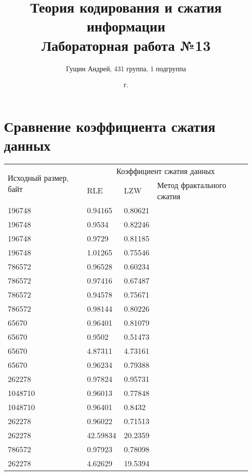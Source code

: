 \documentclass[a4paper,oneside]{article}
\title{{Теория кодирования и сжатия информации}\\{Лабораторная работа №13}}
\author{Гущин Андрей, 431 группа, 1 подгруппа}
\date{\the\year{} г.}
\theoremstyle{definition}
\begin{document}
\maketitle

\section{Сравнение коэффициента сжатия данных}

\begin{table}[H]
  \small
  \centering
  \begin{tabular}{|p{1.5cm}|p{2cm}|p{2cm}|p{2cm}|}
    \hline
    \multirow{2}{1.5cm}{Исходный размер, байт} & \multicolumn{3}{c|}{Коэффициент сжатия данных} \\ \cline{2-4}
                                               & RLE & LZW & Метод фрактального сжатия \\ \hline \hline
    196748  & 0.94165  & 0.80621 & \\ \hline
    196748  & 0.9534   & 0.82246 & \\ \hline
    196748  & 0.9729   & 0.81185 & \\ \hline
    196748  & 1.01265  & 0.75546 & \\ \hline
    786572  & 0.96528  & 0.60234 & \\ \hline
    786572  & 0.97416  & 0.67487 & \\ \hline
    786572  & 0.94578  & 0.75671 & \\ \hline
    786572  & 0.98144  & 0.80226 & \\ \hline
    65670   & 0.96401  & 0.81079 & \\ \hline
    65670   & 0.9502   & 0.51473 & \\ \hline
    65670   & 4.87311  & 4.73161 & \\ \hline
    65670   & 0.96234  & 0.79388 & \\ \hline
    262278  & 0.97824  & 0.95731 & \\ \hline
    1048710 & 0.96013  & 0.77848 & \\ \hline
    1048710 & 0.96401  & 0.8432  & \\ \hline
    262278  & 0.96022  & 0.71513 & \\ \hline
    262278  & 42.59834 & 20.2359 & \\ \hline
    786572  & 0.97923  & 0.78098 & \\ \hline
    262278  & 4.62629  & 19.5394 & \\ \hline
  \end{tabular}
\end{table}
\end{document}
